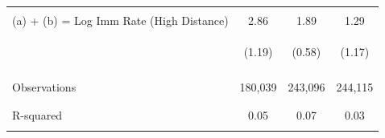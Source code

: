 \begin{center}
\begin{tabular}{lccc}
 & \begin{footnotesize}[0.793]\end{footnotesize} & \begin{footnotesize}[0.127]\end{footnotesize} & \begin{footnotesize}[0.108]\end{footnotesize}\\
\noalign{\smallskip}(a) + (b) = Log Imm Rate (High Distance) & 2.86 & 1.89 & 1.29\\
 & \begin{footnotesize}(1.19)\end{footnotesize} & \begin{footnotesize}(0.58)\end{footnotesize} & \begin{footnotesize}(1.17)\end{footnotesize}\\
 & \begin{footnotesize}[0.018]\end{footnotesize} & \begin{footnotesize}[0.002]\end{footnotesize} & \begin{footnotesize}[0.272]\end{footnotesize}\\
\noalign{\smallskip}Observations & 180,039 & 243,096 & 244,115\\
 & \begin{footnotesize}\end{footnotesize} & \begin{footnotesize}\end{footnotesize} & \begin{footnotesize}\end{footnotesize}\\
 & \begin{footnotesize}\end{footnotesize} & \begin{footnotesize}\end{footnotesize} & \begin{footnotesize}\end{footnotesize}\\
\noalign{\smallskip}R-squared & 0.05 & 0.07 & 0.03\\
 & \begin{footnotesize}\end{footnotesize} & \begin{footnotesize}\end{footnotesize} & \begin{footnotesize}\end{footnotesize}\\

\end{tabular}
\end{center}
